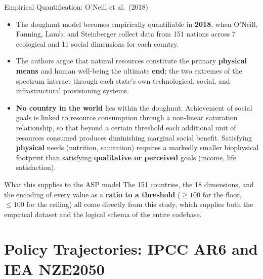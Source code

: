 \documentclass[11pt,aspectratio=169]{beamer}
\begin{document}
\begin{frame}{Empirical Quantification: O'Neill et al.\ (2018)}
  \footnotesize
  \begin{itemize}
    \item The doughnut model becomes empirically quantifiable in \textbf{2018}, when O'Neill, Fanning, Lamb, and Steinberger collect data from \alert{151 nations} across \alert{7 ecological} and \alert{11 social} dimensions for each country.
    \item The authors argue that natural resources constitute the primary \textbf{physical means} and human well-being the ultimate \textbf{end}; the two extremes of the spectrum interact through each state's own technological, social, and infrastructural provisioning systems.
    \item \textbf{No country in the world} lies within the doughnut. Achievement of social goals is linked to resource consumption through a \alert{non-linear saturation relationship}, so that beyond a certain threshold each additional unit of resources consumed produces diminishing marginal social benefit. Satisfying \textbf{physical} needs (nutrition, sanitation) requires a markedly smaller biophysical footprint than satisfying \textbf{qualitative or perceived} goals (income, life satisfaction).
  \end{itemize}
  \begin{block}{What this supplies to the ASP model}
    The 151 countries, the 18 dimensions, and the encoding of every value as a \textbf{ratio to a threshold} ($\geq 100$ for the floor, $\leq 100$ for the ceiling) all come directly from this study, which supplies both the empirical dataset and the logical schema of the entire codebase.
  \end{block}
\end{frame}

\section[Policy Trajectories]{Policy Trajectories: IPCC AR6 and IEA NZE2050}
\end{document}
